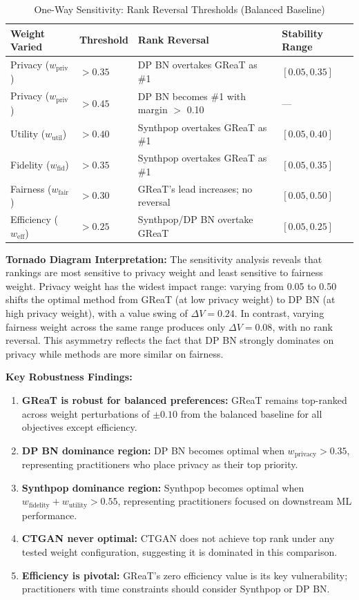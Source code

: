 \documentclass[12pt,a4paper]{article}
\begin{document}
\begin{table}[htbp]
\centering
\caption{One-Way Sensitivity: Rank Reversal Thresholds (Balanced Baseline)}
\label{tab:rank_reversal}
\begin{tabular}{@{}llll@{}}
\toprule
\textbf{Weight Varied} & \textbf{Threshold} & \textbf{Rank Reversal} & \textbf{Stability Range} \\
\midrule
Privacy ($w_{\text{priv}}$) & $> 0.35$ & DP BN overtakes GReaT as \#1 & $[0.05, 0.35]$ \\
Privacy ($w_{\text{priv}}$) & $> 0.45$ & DP BN becomes \#1 with margin $>$ 0.10 & --- \\
Utility ($w_{\text{util}}$) & $> 0.40$ & Synthpop overtakes GReaT as \#1 & $[0.05, 0.40]$ \\
Fidelity ($w_{\text{fid}}$) & $> 0.35$ & Synthpop overtakes GReaT as \#1 & $[0.05, 0.35]$ \\
Fairness ($w_{\text{fair}}$) & $> 0.30$ & GReaT's lead increases; no reversal & $[0.05, 0.50]$ \\
Efficiency ($w_{\text{eff}}$) & $> 0.25$ & Synthpop/DP BN overtake GReaT & $[0.05, 0.25]$ \\
\bottomrule
\end{tabular}
\end{table}

\textbf{Tornado Diagram Interpretation:} The sensitivity analysis reveals that rankings are most sensitive to privacy weight and least sensitive to fairness weight. Privacy weight has the widest impact range: varying from 0.05 to 0.50 shifts the optimal method from GReaT (at low privacy weight) to DP BN (at high privacy weight), with a value swing of $\Delta V = 0.24$. In contrast, varying fairness weight across the same range produces only $\Delta V = 0.08$, with no rank reversal. This asymmetry reflects the fact that DP BN strongly dominates on privacy while methods are more similar on fairness.

\textbf{Key Robustness Findings:}
\begin{enumerate}
    \item \textbf{GReaT is robust for balanced preferences:} GReaT remains top-ranked across weight perturbations of $\pm 0.10$ from the balanced baseline for all objectives except efficiency.
    \item \textbf{DP BN dominance region:} DP BN becomes optimal when $w_{\text{privacy}} > 0.35$, representing practitioners who place privacy as their top priority.
    \item \textbf{Synthpop dominance region:} Synthpop becomes optimal when $w_{\text{fidelity}} + w_{\text{utility}} > 0.55$, representing practitioners focused on downstream ML performance.
    \item \textbf{CTGAN never optimal:} CTGAN does not achieve top rank under any tested weight configuration, suggesting it is dominated in this comparison.
    \item \textbf{Efficiency is pivotal:} GReaT's zero efficiency value is its key vulnerability; practitioners with time constraints should consider Synthpop or DP BN.
\end{enumerate}
\end{document}
